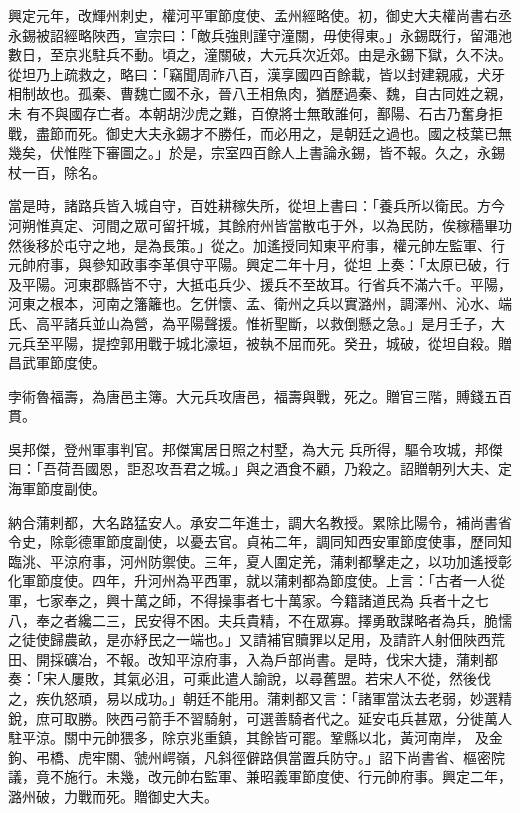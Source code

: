 \begin{pinyinscope}
 興定元年，改輝州刺史，權河平軍節度使、孟州經略使。初，御史大夫權尚書右丞永錫被詔經略陜西，宣宗曰：「敵兵強則謹守潼關，毋使得東。」永錫既行，留澠池數日，至京兆駐兵不動。頃之，潼關破，大元兵次近郊。由是永錫下獄，久不決。從坦乃上疏救之，略曰：「竊聞周祚八百，漢享國四百餘載，皆以封建親戚，犬牙相制故也。孤秦、曹魏亡國不永，晉八王相魚肉，猶歷過秦、魏，自古同姓之親，未
 有不與國存亡者。本朝胡沙虎之難，百僚將士無敢誰何，鄯陽、石古乃奮身拒戰，盡節而死。御史大夫永錫才不勝任，而必用之，是朝廷之過也。國之枝葉已無幾矣，伏惟陛下審圖之。」於是，宗室四百餘人上書論永錫，皆不報。久之，永錫杖一百，除名。



 當是時，諸路兵皆入城自守，百姓耕稼失所，從坦上書曰：「養兵所以衛民。方今河朔惟真定、河間之眾可留扞城，其餘府州皆當散屯于外，以為民防，俟稼穡畢功然後移於屯守之地，是為長策。」從之。加遙授同知東平府事，權元帥左監軍、行元帥府事，與參知政事李革俱守平陽。興定二年十月，從坦
 上奏：「太原已破，行及平陽。河東郡縣皆不守，大抵屯兵少、援兵不至故耳。行省兵不滿六千。平陽，河東之根本，河南之籓籬也。乞併懷、孟、衛州之兵以實潞州，調澤州、沁水、端氏、高平諸兵並山為營，為平陽聲援。惟祈聖斷，以救倒懸之急。」是月壬子，大元兵至平陽，提控郭用戰于城北濠垣，被執不屈而死。癸丑，城破，從坦自殺。贈昌武軍節度使。



 孛術魯福壽，為唐邑主簿。大元兵攻唐邑，福壽與戰，死之。贈官三階，賻錢五百貫。



 吳邦傑，登州軍事判官。邦傑寓居日照之村墅，為大元
 兵所得，驅令攻城，邦傑曰：「吾荷吾國恩，詎忍攻吾君之城。」與之酒食不顧，乃殺之。詔贈朝列大夫、定海軍節度副使。



 納合蒲剌都，大名路猛安人。承安二年進士，調大名教授。累除比陽令，補尚書省令史，除彰德軍節度副使，以憂去官。貞祐二年，調同知西安軍節度使事，歷同知臨洮、平涼府事，河州防禦使。三年，夏人圍定羌，蒲剌都擊走之，以功加遙授彰化軍節度使。四年，升河州為平西軍，就以蒲剌都為節度使。上言：「古者一人從軍，七家奉之，興十萬之師，不得操事者七十萬家。今籍諸道民為
 兵者十之七八，奉之者纔二三，民安得不困。夫兵貴精，不在眾寡。擇勇敢謀略者為兵，脆懦之徒使歸農畝，是亦紓民之一端也。」又請補官贖罪以足用，及請許人射佃陜西荒田、開採礦冶，不報。改知平涼府事，入為戶部尚書。是時，伐宋大捷，蒲剌都奏：「宋人屢敗，其氣必沮，可乘此遣人諭說，以尋舊盟。若宋人不從，然後伐之，疾仇怒頑，易以成功。」朝廷不能用。蒲剌都又言：「諸軍當汰去老弱，妙選精銳，庶可取勝。陜西弓箭手不習騎射，可選善騎者代之。延安屯兵甚眾，分徙萬人駐平涼。關中元帥猥多，除京兆重鎮，其餘皆可罷。鞏縣以北，黃河南岸，
 及金鉤、弔橋、虎牢關、虢州崿嶺，凡斜徑僻路俱當置兵防守。」詔下尚書省、樞密院議，竟不施行。未幾，改元帥右監軍、兼昭義軍節度使、行元帥府事。興定二年，潞州破，力戰而死。贈御史大夫。




\end{pinyinscope}
